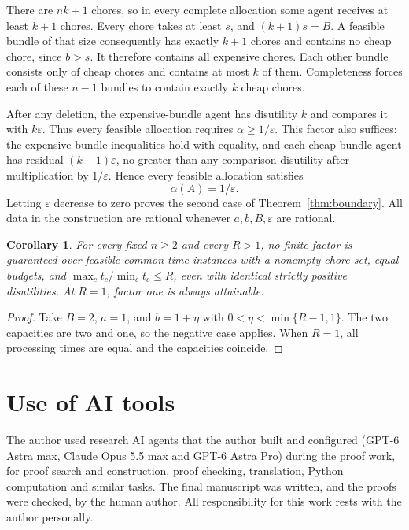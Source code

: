 \documentclass[11pt]{article}
\newtheorem{corollary}[theorem]{Corollary}
\begin{document}
There are $nk+1$ chores, so in every complete allocation some agent receives
at least $k+1$ chores. Every chore takes at least $s$, and $(k+1)s=B$.
A feasible bundle of that size consequently has exactly $k+1$ chores and
contains no cheap chore, since $b>s$. It therefore contains all expensive
chores. Each other bundle consists only of cheap chores and contains at most
$k$ of them. Completeness forces each of these $n-1$ bundles to contain
exactly $k$ cheap chores.

After any deletion, the expensive-bundle agent has disutility $k$ and compares
it with $k\varepsilon$. Thus every feasible allocation requires
$\alpha\ge1/\varepsilon$. This factor also suffices: the expensive-bundle
inequalities hold with equality, and each cheap-bundle agent has residual
$(k-1)\varepsilon$, no greater than any comparison disutility after
multiplication by $1/\varepsilon$. Hence every feasible allocation satisfies
\[
                           \alpha(A)=1/\varepsilon.
\]
Letting $\varepsilon$ decrease to zero proves the second case of
Theorem~\ref{thm:boundary}. All data in the construction are rational whenever
$a,b,B,\varepsilon$ are rational.

\begin{corollary}
For every fixed $n\ge2$ and every $R>1$, no finite factor is guaranteed over
feasible common-time instances with a nonempty chore set, equal budgets, and
$\max_c t_c/\min_c t_c\le R$, even with identical strictly positive
disutilities. At $R=1$, factor one is always attainable.
\end{corollary}
\begin{proof}
Take $B=2$, $a=1$, and $b=1+\eta$ with
$0<\eta<\min\{R-1,1\}$. The two capacities are two and one, so the negative
case applies. When $R=1$, all processing times are equal and the capacities
coincide.
\end{proof}

\section*{Use of AI tools}
The author used research AI agents that the author built and configured (GPT-6 Astra max,
Claude Opus 5.5 max and GPT-6 Astra Pro) during the proof work, for proof search and
construction, proof checking, translation, Python computation and similar tasks. The final
manuscript was written, and the proofs were checked, by the human author. All responsibility
for this work rests with the author personally.
\end{document}

